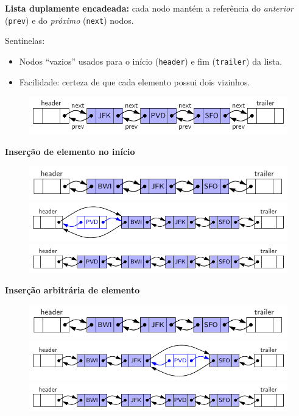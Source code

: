 \textbf{Lista duplamente encadeada:} cada nodo mantém a referência do \textit{anterior} (\texttt{prev}) e do \textit{próximo} (\texttt{next}) nodos.

\medskip

Sentinelas:
\begin{itemize}
	\item Nodos ``vazios'' usados para o início (\texttt{header}) e fim (\texttt{trailer}) da lista.
	\item Facilidade: certeza de que cada elemento possui dois vizinhos.
\end{itemize}

\begin{figure}[H]
	\centering
	\includegraphics[width=0.8\linewidth]{img/figure-3-19}
\end{figure}

\textbf{Inserção de elemento no início}

\begin{figure}[H]
	\centering
	\includegraphics[width=0.58\linewidth]{img/figure-3-21a}
	\includegraphics[width=0.7\linewidth]{img/figure-3-21b}
	\includegraphics[width=0.7\linewidth]{img/figure-3-21c}
\end{figure}

\clearpage

\textbf{Inserção arbitrária de elemento}

\begin{figure}[H]
	\centering
	\includegraphics[width=0.58\linewidth]{img/figure-3-20a}
	\includegraphics[width=0.7\linewidth]{img/figure-3-20b}
	\includegraphics[width=0.7\linewidth]{img/figure-3-20c}
\end{figure}

